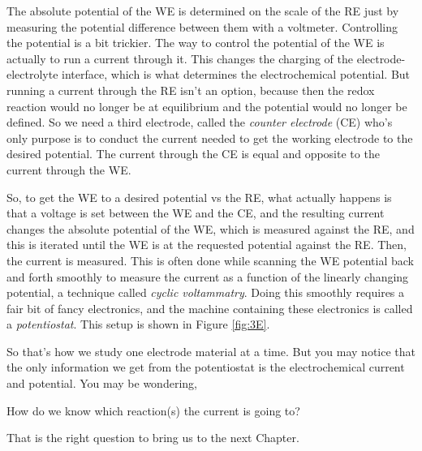 The absolute potential of the WE is determined on the scale of the RE just by measuring the potential difference between them with a voltmeter. Controlling the potential is a bit trickier. The way to control the potential of the WE is actually to run a current through it. This changes the charging of the electrode-electrolyte interface, which is what determines the electrochemical potential. But running a current through the RE isn't an option, because then the redox reaction would no longer be at equilibrium and the potential would no longer be defined. So we need a third electrode, called the \textit{counter electrode} (CE) who's only purpose is to conduct the current needed to get the working electrode to the desired potential. The current through the CE is equal and opposite to the current through the WE.

So, to get the WE to a desired potential vs the RE, what actually happens is that a voltage is set between the WE and the CE, and the resulting current changes the absolute potential of the WE, which is measured against the RE, and this is iterated until the WE is at the requested potential against the RE. Then, the current is measured. This is often done while scanning the WE potential back and forth smoothly to measure the current as a function of the linearly changing potential, a technique called \textit{cyclic voltammatry}. Doing this smoothly requires a fair bit of fancy electronics, and the machine containing these electronics is called a \textit{potentiostat}. This setup is shown in Figure \ref{fig:3E}.

So that's how we study one electrode material at a time. But you may notice that the only information we get from the potentiostat is the electrochemical current and potential. You may be wondering,
\begin{question}
	How do we know which reaction(s) the current is going to?
\end{question}
That is the right question to bring us to the next Chapter.


